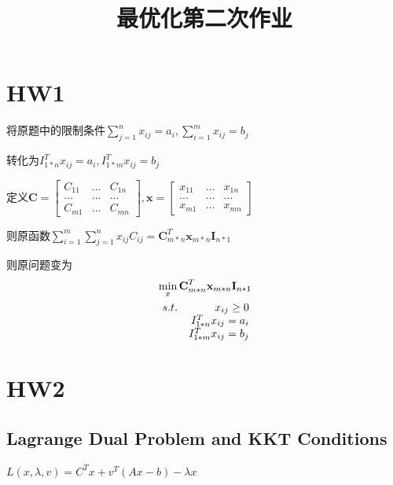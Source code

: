 \documentclass{xjtureport}
\title{最优化第二次作业}
\date{\zhtoday}
\begin{document}
\makecover

\makeheader


\section{HW1}
将原题中的限制条件$\sum_{j=1}^{n} x_{ij} = a_{i}, \sum_{i=1}^{m} x_{ij} = b_{j}$

转化为$I_{1*n}^{T} x_{ij} = a_{i}, I_{1*m}^{T} x_{ij} = b_{j}$

定义$\textbf{C}= \begin{bmatrix}
    C_{11} &...  & C_{1n}\\ 
     ...& ... & ...\\ 
     C_{m1}& ... &C_{mn} 
    \end{bmatrix}, 
    \textbf{x}= \begin{bmatrix}
        x_{11} &...  & x_{1n}\\ 
         ...& ... & ...\\ 
         x_{m1}& ... &x_{mn} 
        \end{bmatrix}$

则原函数$\sum_{i=1}^{m} \sum_{j=1}^{n} x_{ij}C_{ij} = \textbf{C}_{m*n}^{T}\textbf{x}_{m*n}\textbf{I}_{n*1}$

则原问题变为
\begin{equation}
    \begin{aligned} \label{P}
        & \min_{x} \textbf{C}_{m*n}^{T}\textbf{x}_{m*n}\textbf{I}_{n*1}\\
        &\begin{array}[]{r@{\quad}r@{}l@{\quad}l}
        s.t.& x_{ij} \geq 0\\
            & I_{1*n}^{T} x_{ij} = a_{i} \\
            & I_{1*m}^{T} x_{ij} = b_{j} \\
        \end{array}
    \end{aligned}
\end{equation}
\section{HW2}

\subsection{Lagrange Dual Problem and KKT Conditions}
$L(x,\lambda, v) = C^{T}x+v^{T}(Ax-b)-\lambda x$
\end{document}
